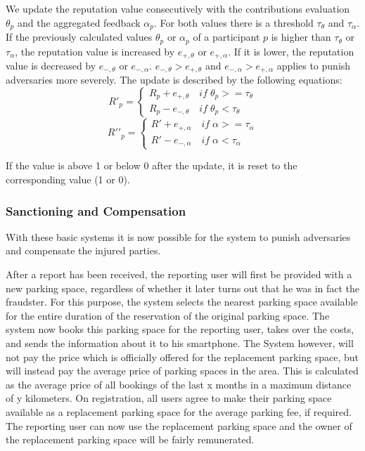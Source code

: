 \documentclass[
a4paper,     %
titlepage,   %
14pt         %
]{scrartcl}  %
\theoremstyle{mystyle}
\begin{document}
We update the reputation value consecutively with the contributions evaluation $\theta_p$  and the aggregated feedback $\alpha_p$. For both values there is a threshold $\tau_\theta$ and $\tau_\alpha$. If the previously calculated values $\theta_p$ or $\alpha_p$ of a participant $p$ is higher than $\tau_\theta$ or $\tau_\alpha$, the reputation value is increased by $e_{+,\theta}$ or $e_{+,\alpha}$. If it is lower, the reputation value is decreased by $e_{-,\theta}$ or $e_{-,\alpha}$. $e_{-,\theta}>e_{+,\theta}$ and $e_{-,\alpha}>e_{+,\alpha}$ applies to punish adversaries more severely. The update is described by the following equations: 
\begin{equation}
  R\prime_p = \begin{cases} R_p + e_{+,\theta}\quad if\; \theta_p>=\tau_\theta \\ R_p - e_{-,\theta}\quad if\; \theta_p<\tau_\theta \end{cases}
\end{equation}
\begin{equation}
  R\prime\prime_p = \begin{cases} R\prime + e_{+,\alpha}\quad if\; \alpha>=\tau_\alpha \\ R\prime - e_{-,\alpha}\quad if\; \alpha<\tau_\alpha \end{cases}
\end{equation}

If the value is above 1 or below 0 after the update, it is reset to the corresponding value (1 or 0).

\subsubsection{Sanctioning and Compensation}\label{section:Sanctioning and Compensation} With these basic systems it is now possible for the system to punish adversaries and compensate the injured parties. 

After a report has been received, the reporting user will first be provided with a new parking space, regardless of whether it later turns out that he was in fact the fraudster. For this purpose, the system selects the nearest parking space available for the entire duration of the reservation of the original parking space. The system now books this parking space for the reporting user, takes over the costs, and sends the information about it to his smartphone. The System however, will not pay the price which is officially offered for the replacement parking space, but will instead pay the average price of parking spaces in the area. This is calculated as the average price of all bookings of the last x months in a maximum distance of y kilometers. On registration, all users agree to make their parking space available as a replacement parking space for the average parking fee, if required. The reporting user can now use the replacement parking space and the owner of the replacement parking space will be fairly remunerated.
\end{document}
